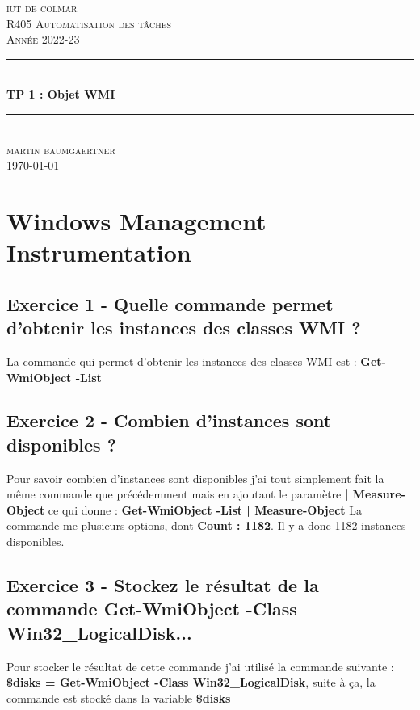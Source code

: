 \documentclass[12pt, a4paper]{article}
\begin{document}
\begin{titlepage}
	\newcommand{\HRule}{\rule{\linewidth}{0.5mm}} 
	\center 
	\textsc{\LARGE iut de colmar}\\[6.5cm] 
	\textsc{\Large R405 Automatisation des tâches}\\[0.5cm] 
	\textsc{\large Année 2022-23}\\[0.5cm]
	\HRule\\[0.75cm]
	{\huge\bfseries TP 1 : Objet WMI}\\[0.4cm]
	\HRule\\[1.5cm]
	\textsc{\large martin baumgaertner}\\[6.5cm] 

	\vfill\vfill\vfill
	{\large\today} 
	\vfill
\end{titlepage}
\newpage
\tableofcontents
\newpage
\section{Windows Management Instrumentation}
\subsection{Exercice 1 - Quelle commande permet d’obtenir les instances des classes WMI ?}

La commande qui permet d'obtenir les instances des classes WMI est : 
\textbf{Get-WmiObject -List}

\subsection{Exercice 2 - Combien d’instances sont disponibles ?}
Pour savoir combien d'instances sont disponibles j'ai tout simplement fait la même 
commande que précédemment mais en ajoutant le paramètre \textbf{ | Measure-Object}
ce qui donne : \textbf{Get-WmiObject -List | Measure-Object}
La commande me plusieurs options, dont \textbf{Count : 1182}. Il y a donc 1182
instances disponibles.

\subsection{Exercice 3 - Stockez le résultat de la commande Get-WmiObject -Class Win32\_LogicalDisk...}

Pour stocker le résultat de cette commande j'ai utilisé la commande suivante : 
\textbf{\$disks = Get-WmiObject -Class Win32\_LogicalDisk}, suite à ça, la 
commande est stocké dans la variable \textbf{\$disks}\\
\end{document}
